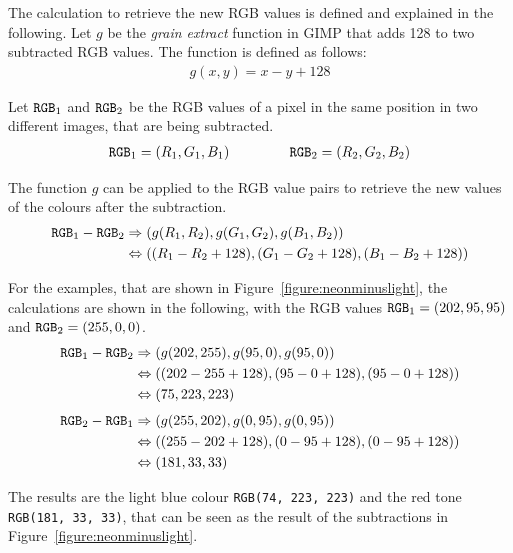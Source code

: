 \documentclass[../MasterThesis.tex]{subfiles}
\begin{document}
The calculation to retrieve the new RGB values is defined and explained in the following.
Let $g$ be the \textit{grain extract} function in GIMP that adds 128 to two subtracted RGB values. The function is defined as follows:
%
\begin{align*}
	g(x, y) = x - y + 128
\end{align*}

Let $\text{\texttt{RGB}}_1$ and $\text{\texttt{RGB}}_2$ be the RGB values of a pixel in the same position in two different images, that are being subtracted.
%
\begin{align*}
	\text{\texttt{RGB}}_1 = (R_1, G_1, B_1) \ \ \ \ \ \ \ \ \ \ \ \ \ 
	\text{\texttt{RGB}}_2 = (R_2, G_2, B_2)
\end{align*}

The function $g$ can be applied to the RGB value pairs to retrieve the new values of the colours after the subtraction.
%
\begin{align*}
	\text{\texttt{RGB}}_1 - \text{\texttt{RGB}}_2 & \Rightarrow (g(R_1, R_2), g(G_1, G_2), g(B_1, B_2)) \\
	 & \Leftrightarrow ((R_1 - R_2 + 128), (G_1 - G_2 + 128) , (B_1 - B_2 + 128)) 
\end{align*}


For the examples, that are shown in Figure~\ref{figure:neonminuslight}, the calculations are shown in the following, with the RGB values $\text{\texttt{RGB}}_1 = (202, 95, 95)$ and
$\text{\texttt{RGB}}_2 = (255, 0, 0)$.
%
\begin{align*}
	\text{\texttt{RGB}}_1 - \text{\texttt{RGB}}_2 & \Rightarrow (g(202, 255), g(95, 0), g(95, 0)) \\
	 & \Leftrightarrow ((202 - 255 + 128), (95 - 0 + 128) , (95 - 0 + 128)) \\
	 & \Leftrightarrow (75, 223, 223) 
\end{align*}
%
%
\begin{align*}
	\text{\texttt{RGB}}_2 - \text{\texttt{RGB}}_1 & \Rightarrow (g(255, 202), g(0, 95), g(0, 95)) \\
	 & \Leftrightarrow ((255 - 202 + 128), (0 - 95 + 128) , (0 - 95 + 128)) \\
	 & \Leftrightarrow (181, 33, 33) 
\end{align*}

The results are the light blue colour \texttt{RGB(74, 223, 223)} and the red tone \texttt{RGB(181, 33, 33)}, that can be seen as the result of the subtractions in Figure~\ref{figure:neonminuslight}. 




















	
	
	
	
\end{document}
